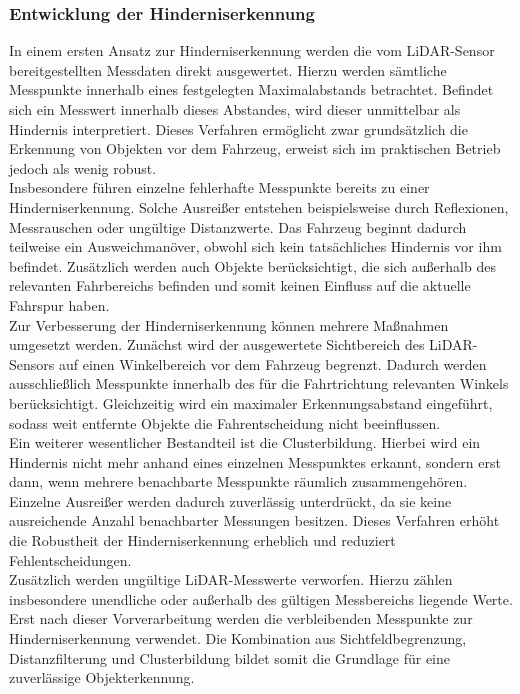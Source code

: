 \subsubsection{Entwicklung der Hinderniserkennung}
In einem ersten Ansatz zur Hinderniserkennung werden die vom LiDAR-Sensor bereitgestellten Messdaten direkt ausgewertet. Hierzu werden sämtliche Messpunkte innerhalb eines festgelegten Maximalabstands betrachtet. Befindet sich ein Messwert innerhalb dieses Abstandes, wird dieser unmittelbar als Hindernis interpretiert. Dieses Verfahren ermöglicht zwar grundsätzlich die Erkennung von Objekten vor dem Fahrzeug, erweist sich im praktischen Betrieb jedoch als wenig robust.
\\
Insbesondere führen einzelne fehlerhafte Messpunkte bereits zu einer Hinderniserkennung. Solche Ausreißer entstehen beispielsweise durch Reflexionen, Messrauschen oder ungültige Distanzwerte. Das Fahrzeug beginnt dadurch teilweise ein Ausweichmanöver, obwohl sich kein tatsächliches Hindernis vor ihm befindet. Zusätzlich werden auch Objekte berücksichtigt, die sich außerhalb des relevanten Fahrbereichs befinden und somit keinen Einfluss auf die aktuelle Fahrspur haben.
\\
Zur Verbesserung der Hinderniserkennung können mehrere Maßnahmen umgesetzt werden. Zunächst wird der ausgewertete Sichtbereich des LiDAR-Sensors auf einen Winkelbereich vor dem Fahrzeug begrenzt. Dadurch werden ausschließlich Messpunkte innerhalb des für die Fahrtrichtung relevanten Winkels berücksichtigt. Gleichzeitig wird ein maximaler Erkennungsabstand eingeführt, sodass weit entfernte Objekte die Fahrentscheidung nicht beeinflussen.
\\
Ein weiterer wesentlicher Bestandteil ist die Clusterbildung. Hierbei wird ein Hindernis nicht mehr anhand eines einzelnen Messpunktes erkannt, sondern erst dann, wenn mehrere benachbarte Messpunkte räumlich zusammengehören. Einzelne Ausreißer werden dadurch zuverlässig unterdrückt, da sie keine ausreichende Anzahl benachbarter Messungen besitzen. Dieses Verfahren erhöht die Robustheit der Hinderniserkennung erheblich und reduziert Fehlentscheidungen.
\\
Zusätzlich werden ungültige LiDAR-Messwerte verworfen. Hierzu zählen insbesondere unendliche oder außerhalb des gültigen Messbereichs liegende Werte. Erst nach dieser Vorverarbeitung werden die verbleibenden Messpunkte zur Hinderniserkennung verwendet. Die Kombination aus Sichtfeldbegrenzung, Distanzfilterung und Clusterbildung bildet somit die Grundlage für eine zuverlässige Objekterkennung.

